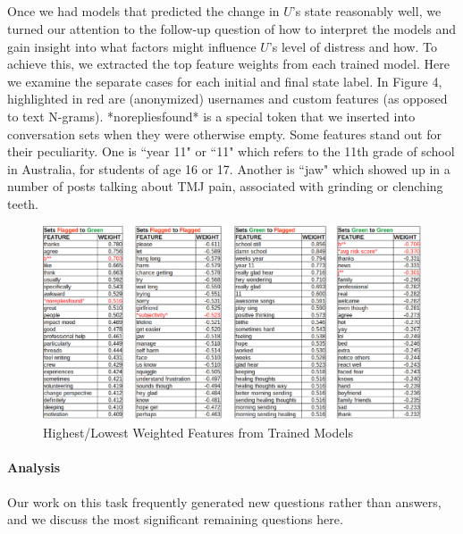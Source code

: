 \documentclass{article}
\begin{document}
\subparagraph{}Once we had models that predicted the change in $U$'s state reasonably well, we turned our attention to the follow-up question of how to interpret the models and gain insight into what factors might influence $U$'s level of distress and how. To achieve this, we extracted the top feature weights from each trained model. Here we examine the separate cases for each initial and final state label. In Figure 4, highlighted in red are (anonymized) usernames and custom features (as opposed to text N-grams). *norepliesfound* is a special token that we inserted into conversation sets when they were otherwise empty. Some features stand out for their peculiarity. One is ``year 11" or ``11" which refers to the 11th grade of school in Australia, for students of age 16 or 17. Another is ``jaw" which showed up in a number of posts talking about TMJ pain, associated with grinding or clenching teeth.

\begin{figure}[h!]
    \includegraphics[width=16cm]{topfeatures}
    \caption{Highest/Lowest Weighted Features from Trained Models}
\end{figure}

\paragraph{Analysis}Our work on this task frequently generated new questions rather than answers, and we discuss the most significant remaining questions here.
\end{document}

